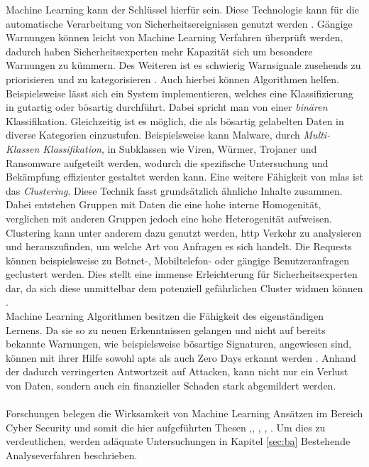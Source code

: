\documentclass[
    12pt, %
    DIV10,
    ngerman, %
    a4paper, %
    oneside, %
    titlepage, %
    parskip=half, %
    headings=normal, %
    listof=totoc, %
    bibliography=totoc, %
    index=totoc, %
    captions=tableheading, %
    final %
]{scrreprt}
\begin{document}
Machine Learning kann der Schlüssel hierfür sein. Diese Technologie kann für die automatische Verarbeitung von Sicherheitsereignissen genutzt werden \parencite{Singla2019}. Gängige Warnungen können leicht von Machine Learning Verfahren überprüft werden, dadurch haben Sicherheitsexperten mehr Kapazität sich um besondere Warnungen zu kümmern. Des Weiteren ist es schwierig Warnsignale zusehends zu priorisieren und zu kategorisieren \parencite{JoshuaSaxe2018}. Auch hierbei können Algorithmen helfen. Beispielsweise lässt sich ein System implementieren, welches eine Klassifizierung in gutartig oder bösartig durchführt. Dabei spricht man von einer \emph{binären} Klassifikation. Gleichzeitig ist es möglich, die als bösartig gelabelten Daten in diverse Kategorien einzustufen. Beispielsweise kann Malware, durch \emph{Multi-Klassen Klassifikation}, in Subklassen wie Viren, Würmer, Trojaner und Ransomware aufgeteilt werden, wodurch die spezifische Untersuchung und Bekämpfung effizienter gestaltet werden kann.  Eine weitere Fähigkeit von \ac{mlas} ist das \emph{Clustering}. Diese Technik fasst grundsätzlich ähnliche Inhalte zusammen. Dabei entstehen Gruppen mit Daten die eine hohe interne Homogenität, verglichen mit anderen Gruppen jedoch eine hohe Heterogenität aufweisen. Clustering kann unter anderem dazu genutzt werden, \ac{http} Verkehr zu analysieren und herauszufinden, um welche Art von Anfragen es sich handelt. Die Requests können beispielsweise zu Botnet-, Mobiltelefon- oder gängige Benutzeranfragen geclustert werden. Dies stellt eine immense Erleichterung für Sicherheitsexperten dar, da sich diese unmittelbar dem potenziell gefährlichen Cluster widmen können \parencite{JoshuaSaxe2018}. \\Machine Learning Algorithmen besitzen die Fähigkeit des eigenständigen Lernens. Da sie so zu neuen Erkenntnissen gelangen und nicht auf bereits bekannte Warnungen, wie beispielsweise bösartige Signaturen, angewiesen sind, können mit ihrer Hilfe sowohl \ac{apts} als auch Zero Days erkannt werden \parencite{Hu2019}. Anhand der dadurch verringerten Antwortzeit auf Attacken, kann nicht nur ein Verlust von Daten, sondern auch ein finanzieller Schaden stark abgemildert werden.
\\\\
Forschungen belegen die Wirksamkeit von Machine Learning Ansätzen im Bereich Cyber Security und somit die hier aufgeführten Thesen \parencite{Homoliak2019},\parencite{Jeong2019}, \parencite{Sabar2018}, \parencite{Brown2018}, \parencite{Yin2017}. Um dies zu verdeutlichen, werden adäquate Untersuchungen in Kapitel \ref{sec:ba} Bestehende Analyseverfahren beschrieben.
\end{document}
